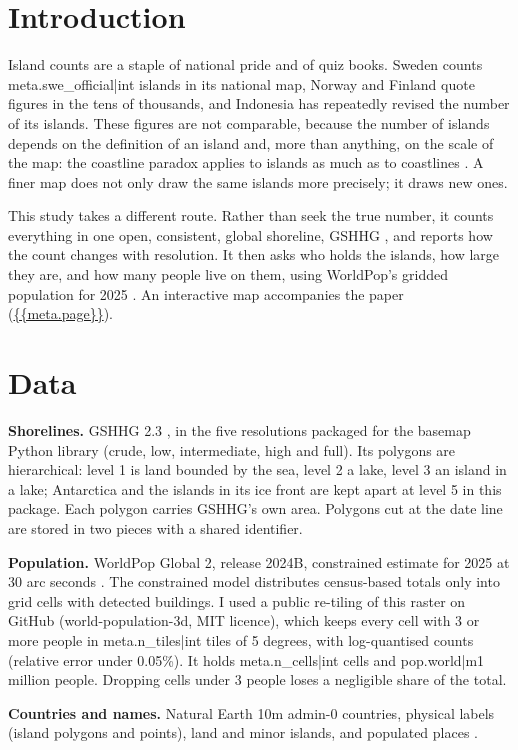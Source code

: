 \documentclass[11pt,a4paper]{article}
\begin{document}
\section{Introduction}
Island counts are a staple of national pride and of quiz books. Sweden counts {{meta.swe_official|int}} islands in its national map, Norway and Finland quote figures in the tens of thousands, and Indonesia has repeatedly revised the number of its islands. These figures are not comparable, because the number of islands depends on the definition of an island and, more than anything, on the scale of the map: the coastline paradox applies to islands as much as to coastlines \citep{mandelbrot}. A finer map does not only draw the same islands more precisely; it draws new ones.

This study takes a different route. Rather than seek the true number, it counts everything in one open, consistent, global shoreline, GSHHG \citep{gshhg}, and reports how the count changes with resolution. It then asks who holds the islands, how large they are, and how many people live on them, using WorldPop's gridded population for 2025 \citep{worldpop}. An interactive map accompanies the paper (\url{{{meta.page}}}).

\section{Data}
\textbf{Shorelines.} GSHHG 2.3 \citep{gshhg}, in the five resolutions packaged for the basemap Python library (crude, low, intermediate, high and full). Its polygons are hierarchical: level 1 is land bounded by the sea, level 2 a lake, level 3 an island in a lake; Antarctica and the islands in its ice front are kept apart at level 5 in this package. Each polygon carries GSHHG's own area. Polygons cut at the date line are stored in two pieces with a shared identifier.

\textbf{Population.} WorldPop Global 2, release 2024B, constrained estimate for 2025 at 30 arc seconds \citep{worldpop}. The constrained model distributes census-based totals only into grid cells with detected buildings. I used a public re-tiling of this raster on GitHub (world-population-3d, MIT licence), which keeps every cell with 3 or more people in {{meta.n_tiles|int}} tiles of 5 degrees, with log-quantised counts (relative error under 0.05\%). It holds {{meta.n_cells|int}} cells and {{pop.world|m1}} million people. Dropping cells under 3 people loses a negligible share of the total.

\textbf{Countries and names.} Natural Earth 10m admin-0 countries, physical labels (island polygons and points), land and minor islands, and populated places \citep{naturalearth}.
\end{document}
